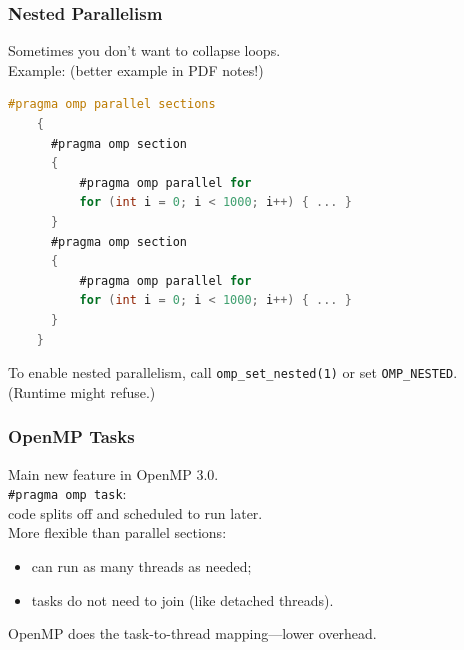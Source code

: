 \begin{frame}[fragile]
  \frametitle{Nested Parallelism}
  

  Sometimes you don't want to collapse loops.\\[1em]

  Example: (better example in PDF notes!)\\[1em]

{\small
  \begin{lstlisting}[language=C,morekeywords={foreach,pragma,omp,parallel,single,nowait,task,untied,barrier,taskyield}]
    #pragma omp parallel sections
    {
      #pragma omp section
      { 
          #pragma omp parallel for
          for (int i = 0; i < 1000; i++) { ... } 
      }
      #pragma omp section
      {
          #pragma omp parallel for
          for (int i = 0; i < 1000; i++) { ... } 
      }
    }
\end{lstlisting}}

  To enable nested parallelism, call \verb+omp_set_nested(1)+ or
  set \verb+OMP_NESTED+. (Runtime might refuse.)\\[1em]

  
  


\end{frame}

\begin{frame}[fragile]
  \frametitle{OpenMP Tasks}
  

  Main new feature in OpenMP 3.0.\\[1em]

  \verb+#pragma omp task+:\\ \qquad code splits off and scheduled to run later.\\[1em]

  More flexible than parallel sections: 
  \begin{itemize}
   \item can run as many threads as needed;
   \item tasks do not need to join (like detached threads).
  \end{itemize}
  OpenMP does the task-to-thread mapping---lower overhead.

  


\end{frame}

